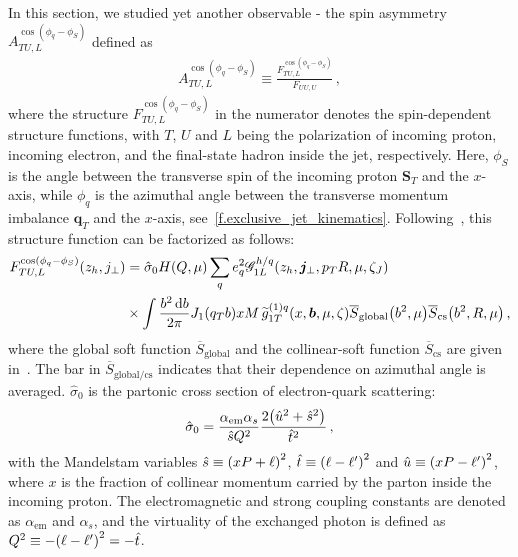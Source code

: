 \documentclass[a4paper, 11 pt]{article}
\begin{document}
In this section, we studied yet another observable - the spin asymmetry $A_{TU,L}^{\cos(\phi _q - \phi _{S})}$ defined as
\begin{align} \label{e.A_LT}
A_{TU,L}^{\cos(\phi _q - \phi _{S})}
\equiv
\frac{F_{TU, L}^{\cos(\phi _q - \phi _{S})}}{F_{UU, U}}
\, ,
\end{align}
where the structure $F_{TU, L}^{\cos(\phi _q - \phi _{S})}$ in the numerator denotes the spin-dependent structure functions, with $T$, $U$ and $L$ being the polarization of incoming proton, incoming electron, and the final-state hadron inside the jet, respectively. Here, $\phi _{S}$ is the angle between the transverse spin of the incoming proton $\boldsymbol{S}_T$ and the $x$-axis, while $\phi _q$ is the azimuthal angle between the transverse momentum imbalance $\boldsymbol{q}_T$ and the $x$-axis, see~\cref{f.exclusive_jet_kinematics}.
Following~\cite{Kang:2021ffh}, this structure function can be factorized as follows:
\begin{align}
F_{TU, L}^{\cos(\phi _q - \phi _{S})} (z_h, j_{\perp})
& =
\hat{\sigma}_0 H \pqty{Q, \mu}
\sum _{q} e_q^2 \mathscr{G}_{1L}^{h/q} \pqty{z_h, \boldsymbol{j}_{\perp}, p_T R,  \mu, \zeta_J}
\nonumber \\
&\times
\int \frac{b^2 \dd{b}}{2 \pi}
J_1 \pqty{q_T b} x M\,\widetilde{g}_{1T}^{(1)q} \pqty{x, \boldsymbol{b}, \mu, \zeta}
\overline{S}_{\mathrm{global}} \pqty{b^2 , \mu}
\overline{S}_{\mathrm{cs}} \pqty{b^2 , R , \mu}
\, , \label{e.F_TUL}
\end{align}
where the global soft function $\overline{S}_{\mathrm{global}}$ and the collinear-soft function $\overline{S}_{\mathrm{cs}}$ are given in~\cite{Kang:2021ffh}. The bar in $\overline{S}_{\mathrm{global}/\mathrm{cs}}$ indicates that their dependence on azimuthal angle is averaged. $\hat{\sigma}_0$ is the partonic cross section of electron-quark scattering:
\begin{equation}
\hat{\sigma}_0
=
\frac{\alpha _{\mathrm{em}} \alpha _s}{\hat{s} Q^2}
\frac{2 \pqty{\hat{u}^2 + \hat{s}^2}}{\hat{t}^2}
\, ,
\end{equation}
with the Mandelstam variables $\hat{s} \equiv \pqty{xP + \ell}^2$, $\hat{t} \equiv \pqty{\ell - \ell '}^2$ and $\hat{u} \equiv \pqty{xP - \ell '}^2$, where $x$ is the fraction of collinear momentum carried by the parton inside the incoming proton.
The electromagnetic and strong coupling constants are denoted as $\alpha _{\mathrm{em}}$ and $\alpha _s$, and the virtuality of the exchanged photon is defined as $Q^2 \equiv - \pqty{\ell - \ell '}^2 = - \hat{t}$.
\end{document}
